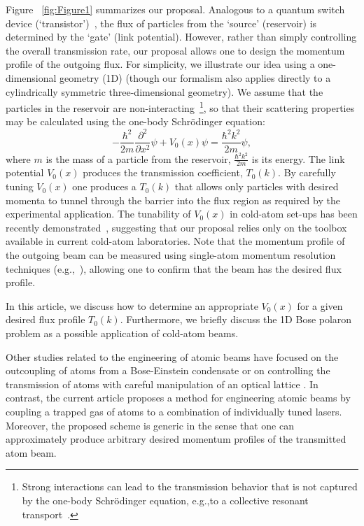 \documentclass[reprint, twocolumn,amsmath,amssymb,showpacs,pra,superscriptaddress,aps]{revtex4-1}
\begin{document}
Figure ~\ref{fig:Figure1} summarizes our proposal. Analogous to a quantum switch device (`transistor')~\cite{zoller2004, marchukov2016,thuberg2017}, the flux of particles from the `source' (reservoir) is determined by the `gate' (link potential). However, rather than simply controlling the overall transmission rate, our proposal allows one to design the momentum profile of the outgoing flux.
 For simplicity, we illustrate our idea using a one-dimensional geometry (1D) (though our formalism also applies directly to a cylindrically symmetric three-dimensional geometry). We assume that the particles in the reservoir are non-interacting~\footnote{Strong interactions can lead to the transmission behavior that is not captured by the one-body Schr{\"o}dinger equation, e.g.,to a collective resonant transport~\cite{Schlagheck2005}.}, so that their scattering properties may be calculated using the one-body Schr{\"o}dinger equation:
\begin{equation}
-\frac{\hbar^2}{2m}\frac{\partial^2}{\partial x^2}\psi+V_0(x)\psi=\frac{\hbar^2k^2}{2m}\psi,
\label{eq:schr}
\end{equation}
where $m$ is the mass of a particle from the reservoir, $\frac{\hbar^2k^2}{2m}$ is its energy. The link potential $V_0(x)$ produces the transmission coefficient, $T_0(k)$. By carefully tuning $V_0(x)$ one produces a $T_0(k)$ that allows only particles with desired momenta to tunnel through the barrier into the flux region as required by the experimental application. The tunability of $V_0(x)$ in cold-atom set-ups has been recently demonstrated~\cite{esslinger2015,esslinger2018,esslinger2019}, 
suggesting that our proposal relies only on the toolbox available in current cold-atom laboratories.
Note that the momentum profile of the outgoing beam can be measured using single-atom momentum resolution techniques (e.g.,~\cite{jochim2018}), allowing one to confirm that the beam has the desired flux profile.

In this article, we discuss how to determine an appropriate $V_0(x)$ for a given desired flux profile $T_0(k)$. Furthermore, we briefly discuss the 1D Bose polaron problem as a possible application of cold-atom beams. 

Other studies related to the engineering of atomic beams have focused on  the  outcoupling  of  atoms  from a Bose-Einstein condensate \cite{PhysRevLett.97.200402, PhysRevA.80.041605, buning2010slow} or on controlling the transmission of atoms with careful manipulation of an optical lattice \cite{PhysRevLett.84.399, PhysRevLett.107.230401, PhysRevA.92.033614}. In contrast, the current article proposes a method for engineering atomic beams by coupling a trapped gas of atoms to a combination of individually tuned lasers. Moreover, the proposed scheme is generic in the sense that one can approximately produce arbitrary desired momentum profiles of the transmitted atom beam.
\end{document}
